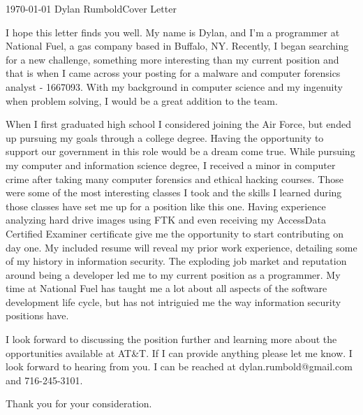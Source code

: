 \documentclass[11pt, letterpaper]{awesome-cv}
\begin{document}
\makecvheader[R]

\makecvfooter
  {\today}%
  {Dylan Rumbold{\enskip\cdotp\enskip}Cover Letter}
  {}

\makelettertitle
  {}

\begin{cvletter}

I hope this letter finds you well. My name is Dylan, and I'm a programmer at National Fuel, a gas company based in Buffalo, NY. Recently, I began searching for a new challenge, something more interesting than my current position and that is when I came across your posting for a malware and computer forensics analyst - 1667093. With my background in computer science and my ingenuity when problem solving, I would be a great addition to the team.

When I first graduated high school I considered joining the Air Force, but ended up pursuing my goals through a college degree. Having the opportunity to support our government in this role would be a dream come true. While pursuing my computer and information science degree, I received a minor in computer crime after taking many computer forensics and ethical hacking courses. Those were some of the most interesting classes I took and the skills I learned during those classes have set me up for a position like this one. Having experience analyzing hard drive images using FTK and even receiving my AccessData Certified Examiner certificate give me the opportunity to start contributing on day one. My included resume will reveal my prior work experience, detailing some of my history in information security. The exploding job market and reputation around being a developer led me to my current position as a programmer. My time at National Fuel has taught me a lot about all aspects of the software development life cycle, but has not intriguied me the way information security positions have.

I look forward to discussing the position further and learning more about the opportunities available at AT\&T. If I can provide anything please let me know. I look forward to hearing from you. I can be reached at dylan.rumbold@gmail.com and 716-245-3101.

Thank you for your consideration.



\end{cvletter}


\makeletterclosing
\end{document}
